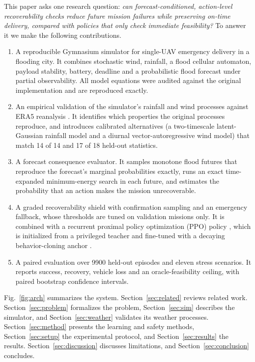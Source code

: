 \documentclass{ieeeaccess}
\begin{document}
This paper asks one research question: \emph{can forecast-conditioned, action-level recoverability checks reduce future mission failures while preserving on-time delivery, compared with policies that only check immediate feasibility?} To answer it we make the following contributions.
\begin{enumerate}
\item A reproducible Gymnasium simulator \cite{towers2024} for single-UAV emergency delivery in a flooding city. It combines stochastic wind, rainfall, a flood cellular automaton, payload stability, battery, deadline and a probabilistic flood forecast under partial observability. All model equations were audited against the original implementation and are reproduced exactly.
\item An empirical validation of the simulator's rainfall and wind processes against ERA5 reanalysis \cite{hersbach2020}. It identifies which properties the original processes reproduce, and introduces calibrated alternatives (a two-timescale latent-Gaussian rainfall model and a diurnal vector-autoregressive wind model) that match 14 of 14 and 17 of 18 held-out statistics.
\item A forecast consequence evaluator. It samples monotone flood futures that reproduce the forecast's marginal probabilities exactly, runs an exact time-expanded minimum-energy search in each future, and estimates the probability that an action makes the mission unrecoverable.
\item A graded recoverability shield with confirmation sampling and an emergency fallback, whose thresholds are tuned on validation missions only. It is combined with a recurrent proximal policy optimization (PPO) policy \cite{schulman2017}, which is initialized from a privileged teacher \cite{chen2019,ross2011} and fine-tuned with a decaying behavior-cloning anchor \cite{schmitt2018}.
\item A paired evaluation over 9900 held-out episodes and eleven stress scenarios. It reports success, recovery, vehicle loss and an oracle-feasibility ceiling, with paired bootstrap confidence intervals.
\end{enumerate}

Fig.~\ref{fig:arch} summarizes the system. Section~\ref{sec:related} reviews related work. Section~\ref{sec:problem} formalizes the problem, Section~\ref{sec:sim} describes the simulator, and Section~\ref{sec:weather} validates its weather processes. Section~\ref{sec:method} presents the learning and safety methods, Section~\ref{sec:setup} the experimental protocol, and Section~\ref{sec:results} the results. Section~\ref{sec:discussion} discusses limitations, and Section~\ref{sec:conclusion} concludes.
\end{document}
